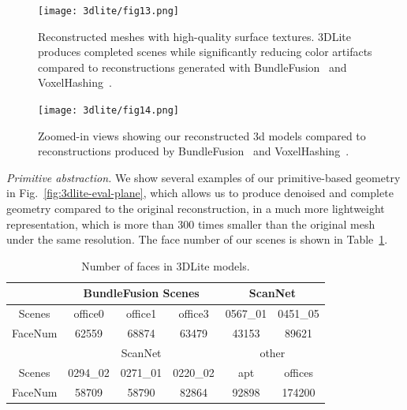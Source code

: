\begin{figure}[!htb]
   \begin{minipage}{0.49\textwidth}
     \centering
    \texttt{[image: 3dlite/fig13.png]}
    \caption{Reconstructed meshes with high-quality surface textures. 
        3DLite produces completed scenes while significantly reducing color artifacts compared to reconstructions generated with BundleFusion~\cite{dai2016bundlefusion} and VoxelHashing~\cite{niessner2013real}.
    }
    \label{fig:3dlite-result-model}
   \end{minipage}\hfill
   \begin{minipage}{0.49\textwidth}
    \texttt{[image: 3dlite/fig14.png]}
    \caption{Zoomed-in views showing our reconstructed 3d models compared to reconstructions produced by BundleFusion~\cite{dai2016bundlefusion} and VoxelHashing~\cite{niessner2013real}.}
    \label{fig:3dlite-result-tex}
   \end{minipage}
\end{figure}


\emph{Primitive abstraction.}
We show several examples of our primitive-based geometry in Fig.~\ref{fig:3dlite-eval-plane}, which allows us to produce denoised and complete geometry compared to the original reconstruction, in a much more lightweight representation, which is more than 300 times smaller than the original mesh under the same resolution. The face number of our scenes is shown in Table~\ref{table:3dlite-face-num}.
\begin{table}
\center
\begin{tabular}{|c|c|c|c|c|c|}
\hline
& \multicolumn{3}{|c|}{BundleFusion Scenes} & \multicolumn{2}{|c|}{ScanNet}\\
\hline
Scenes & office0 & office1 & office3 & 0567\_01 & 0451\_05\\
\hline
FaceNum & 62559 & 68874 & 63479 & 43153 & 89621\\
\hline
\hline
& \multicolumn{3}{|c|}{ScanNet} & \multicolumn{2}{|c|}{other}\\
\hline
Scenes & 0294\_02 & 0271\_01 & 0220\_02 & apt & offices \\
\hline
FaceNum & 58709 & 58790 & 82864 & 92898 & 174200 \\
\hline
\end{tabular}
\caption{Number of faces in 3DLite models.
}
\label{table:3dlite-face-num}
\end{table}

